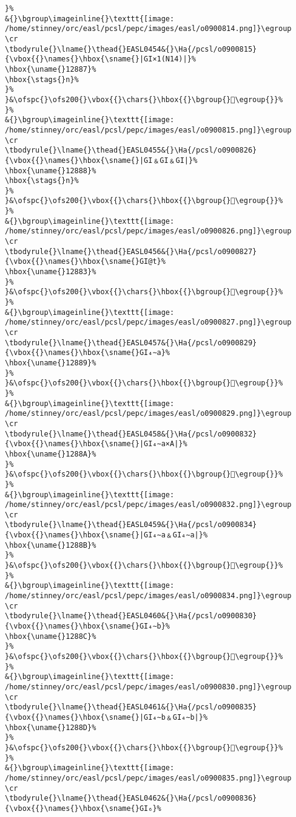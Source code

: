\begin{verbatim}
}%
&{}\bgroup\imageinline{}\texttt{[image: /home/stinney/orc/easl/pcsl/pepc/images/easl/o0900814.png]}\egroup
\cr
\tbodyrule{}\lname{}\thead{}EASL0454&{}\Ha{/pcsl/o0900815}{\vbox{{}\names{}\hbox{\sname{}|GI×1(N14)|}%
\hbox{\uname{}12887}%
\hbox{\stags{}n}%
}%
}&\ofspc{}\ofs200{}\vbox{{}\chars{}\hbox{{}\bgroup{}𒢇\egroup{}}%
}%
&{}\bgroup\imageinline{}\texttt{[image: /home/stinney/orc/easl/pcsl/pepc/images/easl/o0900815.png]}\egroup
\cr
\tbodyrule{}\lname{}\thead{}EASL0455&{}\Ha{/pcsl/o0900826}{\vbox{{}\names{}\hbox{\sname{}|GI﹠GI﹠GI|}%
\hbox{\uname{}12888}%
\hbox{\stags{}n}%
}%
}&\ofspc{}\ofs200{}\vbox{{}\chars{}\hbox{{}\bgroup{}𒢈\egroup{}}%
}%
&{}\bgroup\imageinline{}\texttt{[image: /home/stinney/orc/easl/pcsl/pepc/images/easl/o0900826.png]}\egroup
\cr
\tbodyrule{}\lname{}\thead{}EASL0456&{}\Ha{/pcsl/o0900827}{\vbox{{}\names{}\hbox{\sname{}GI@t}%
\hbox{\uname{}12883}%
}%
}&\ofspc{}\ofs200{}\vbox{{}\chars{}\hbox{{}\bgroup{}𒢃\egroup{}}%
}%
&{}\bgroup\imageinline{}\texttt{[image: /home/stinney/orc/easl/pcsl/pepc/images/easl/o0900827.png]}\egroup
\cr
\tbodyrule{}\lname{}\thead{}EASL0457&{}\Ha{/pcsl/o0900829}{\vbox{{}\names{}\hbox{\sname{}GI₄∼a}%
\hbox{\uname{}12889}%
}%
}&\ofspc{}\ofs200{}\vbox{{}\chars{}\hbox{{}\bgroup{}𒢉\egroup{}}%
}%
&{}\bgroup\imageinline{}\texttt{[image: /home/stinney/orc/easl/pcsl/pepc/images/easl/o0900829.png]}\egroup
\cr
\tbodyrule{}\lname{}\thead{}EASL0458&{}\Ha{/pcsl/o0900832}{\vbox{{}\names{}\hbox{\sname{}|GI₄∼a×A|}%
\hbox{\uname{}1288A}%
}%
}&\ofspc{}\ofs200{}\vbox{{}\chars{}\hbox{{}\bgroup{}𒢊\egroup{}}%
}%
&{}\bgroup\imageinline{}\texttt{[image: /home/stinney/orc/easl/pcsl/pepc/images/easl/o0900832.png]}\egroup
\cr
\tbodyrule{}\lname{}\thead{}EASL0459&{}\Ha{/pcsl/o0900834}{\vbox{{}\names{}\hbox{\sname{}|GI₄∼a﹠GI₄∼a|}%
\hbox{\uname{}1288B}%
}%
}&\ofspc{}\ofs200{}\vbox{{}\chars{}\hbox{{}\bgroup{}𒢋\egroup{}}%
}%
&{}\bgroup\imageinline{}\texttt{[image: /home/stinney/orc/easl/pcsl/pepc/images/easl/o0900834.png]}\egroup
\cr
\tbodyrule{}\lname{}\thead{}EASL0460&{}\Ha{/pcsl/o0900830}{\vbox{{}\names{}\hbox{\sname{}GI₄∼b}%
\hbox{\uname{}1288C}%
}%
}&\ofspc{}\ofs200{}\vbox{{}\chars{}\hbox{{}\bgroup{}𒢌\egroup{}}%
}%
&{}\bgroup\imageinline{}\texttt{[image: /home/stinney/orc/easl/pcsl/pepc/images/easl/o0900830.png]}\egroup
\cr
\tbodyrule{}\lname{}\thead{}EASL0461&{}\Ha{/pcsl/o0900835}{\vbox{{}\names{}\hbox{\sname{}|GI₄∼b﹠GI₄∼b|}%
\hbox{\uname{}1288D}%
}%
}&\ofspc{}\ofs200{}\vbox{{}\chars{}\hbox{{}\bgroup{}𒢍\egroup{}}%
}%
&{}\bgroup\imageinline{}\texttt{[image: /home/stinney/orc/easl/pcsl/pepc/images/easl/o0900835.png]}\egroup
\cr
\tbodyrule{}\lname{}\thead{}EASL0462&{}\Ha{/pcsl/o0900836}{\vbox{{}\names{}\hbox{\sname{}GI₆}%

\end{verbatim}
